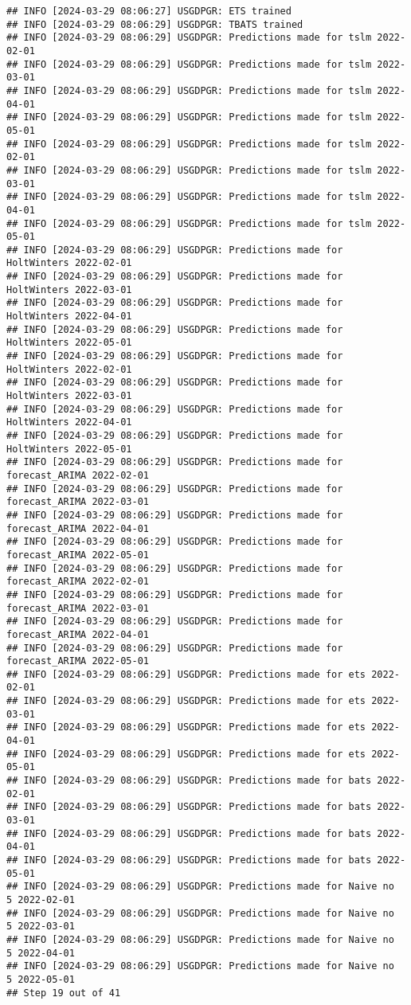 \documentclass[
]{article}
\begin{document}
\begin{verbatim}
## INFO [2024-03-29 08:06:27] USGDPGR: ETS trained
## INFO [2024-03-29 08:06:29] USGDPGR: TBATS trained
## INFO [2024-03-29 08:06:29] USGDPGR: Predictions made for tslm 2022-02-01
## INFO [2024-03-29 08:06:29] USGDPGR: Predictions made for tslm 2022-03-01
## INFO [2024-03-29 08:06:29] USGDPGR: Predictions made for tslm 2022-04-01
## INFO [2024-03-29 08:06:29] USGDPGR: Predictions made for tslm 2022-05-01
## INFO [2024-03-29 08:06:29] USGDPGR: Predictions made for tslm 2022-02-01
## INFO [2024-03-29 08:06:29] USGDPGR: Predictions made for tslm 2022-03-01
## INFO [2024-03-29 08:06:29] USGDPGR: Predictions made for tslm 2022-04-01
## INFO [2024-03-29 08:06:29] USGDPGR: Predictions made for tslm 2022-05-01
## INFO [2024-03-29 08:06:29] USGDPGR: Predictions made for HoltWinters 2022-02-01
## INFO [2024-03-29 08:06:29] USGDPGR: Predictions made for HoltWinters 2022-03-01
## INFO [2024-03-29 08:06:29] USGDPGR: Predictions made for HoltWinters 2022-04-01
## INFO [2024-03-29 08:06:29] USGDPGR: Predictions made for HoltWinters 2022-05-01
## INFO [2024-03-29 08:06:29] USGDPGR: Predictions made for HoltWinters 2022-02-01
## INFO [2024-03-29 08:06:29] USGDPGR: Predictions made for HoltWinters 2022-03-01
## INFO [2024-03-29 08:06:29] USGDPGR: Predictions made for HoltWinters 2022-04-01
## INFO [2024-03-29 08:06:29] USGDPGR: Predictions made for HoltWinters 2022-05-01
## INFO [2024-03-29 08:06:29] USGDPGR: Predictions made for forecast_ARIMA 2022-02-01
## INFO [2024-03-29 08:06:29] USGDPGR: Predictions made for forecast_ARIMA 2022-03-01
## INFO [2024-03-29 08:06:29] USGDPGR: Predictions made for forecast_ARIMA 2022-04-01
## INFO [2024-03-29 08:06:29] USGDPGR: Predictions made for forecast_ARIMA 2022-05-01
## INFO [2024-03-29 08:06:29] USGDPGR: Predictions made for forecast_ARIMA 2022-02-01
## INFO [2024-03-29 08:06:29] USGDPGR: Predictions made for forecast_ARIMA 2022-03-01
## INFO [2024-03-29 08:06:29] USGDPGR: Predictions made for forecast_ARIMA 2022-04-01
## INFO [2024-03-29 08:06:29] USGDPGR: Predictions made for forecast_ARIMA 2022-05-01
## INFO [2024-03-29 08:06:29] USGDPGR: Predictions made for ets 2022-02-01
## INFO [2024-03-29 08:06:29] USGDPGR: Predictions made for ets 2022-03-01
## INFO [2024-03-29 08:06:29] USGDPGR: Predictions made for ets 2022-04-01
## INFO [2024-03-29 08:06:29] USGDPGR: Predictions made for ets 2022-05-01
## INFO [2024-03-29 08:06:29] USGDPGR: Predictions made for bats 2022-02-01
## INFO [2024-03-29 08:06:29] USGDPGR: Predictions made for bats 2022-03-01
## INFO [2024-03-29 08:06:29] USGDPGR: Predictions made for bats 2022-04-01
## INFO [2024-03-29 08:06:29] USGDPGR: Predictions made for bats 2022-05-01
## INFO [2024-03-29 08:06:29] USGDPGR: Predictions made for Naive no  5 2022-02-01
## INFO [2024-03-29 08:06:29] USGDPGR: Predictions made for Naive no  5 2022-03-01
## INFO [2024-03-29 08:06:29] USGDPGR: Predictions made for Naive no  5 2022-04-01
## INFO [2024-03-29 08:06:29] USGDPGR: Predictions made for Naive no  5 2022-05-01
## Step 19 out of 41
\end{verbatim}
\end{document}
